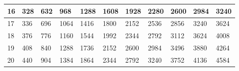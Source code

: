 \begin{table} [htb]
\begin{center}
\begin{tabular}{|l||l|l|l|l|l|l|l|l|l|l|}
    16   & 328 & 632 & 968  & 1288 & 1608 & 1928 & 2280 & 2600 & 2984 & 3240 \\ \hline
    17   & 336 & 696 & 1064 & 1416 & 1800 & 2152 & 2536 & 2856 & 3240 & 3624 \\ \hline
    18   & 376 & 776 & 1160 & 1544 & 1992 & 2344 & 2792 & 3112 & 3624 & 4008 \\ \hline
    19   & 408 & 840 & 1288 & 1736 & 2152 & 2600 & 2984 & 3496 & 3880 & 4264 \\ \hline
    20   & 440 & 904 & 1384 & 1864 & 2344 & 2792 & 3240 & 3752 & 4136 & 4584 \\ \hline
    \end{tabular}
\end{center}
\end{table}


